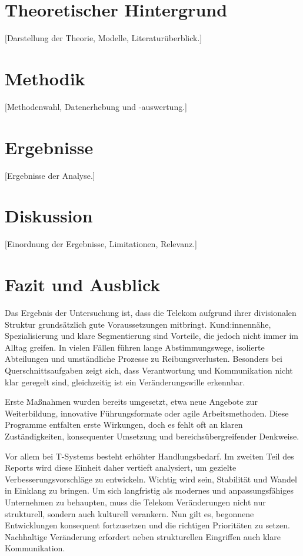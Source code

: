 \documentclass[12pt,a4paper]{article}
\begin{document}
	\section{Theoretischer Hintergrund}
	[Darstellung der Theorie, Modelle, Literaturüberblick.]
	
	\section{Methodik}
	[Methodenwahl, Datenerhebung und -auswertung.]
	
	\section{Ergebnisse}
	[Ergebnisse der Analyse.]
	
	\section{Diskussion}
	[Einordnung der Ergebnisse, Limitationen, Relevanz.]
	
	\section{Fazit und Ausblick }
	
	
	
	
	Das Ergebnis der Untersuchung ist, dass die Telekom aufgrund ihrer
	divisionalen Struktur grundsätzlich gute Voraussetzungen mitbringt.
	Kund:innennähe, Spezialisierung und klare Segmentierung sind Vorteile,
	die jedoch nicht immer im Alltag greifen. In vielen Fällen führen lange
	Abstimmungswege, isolierte Abteilungen und umständliche Prozesse zu
	Reibungsverlusten. Besonders bei Querschnittsaufgaben zeigt sich, dass
	Verantwortung und Kommunikation nicht klar geregelt sind, gleichzeitig
	ist ein Veränderungswille erkennbar.
	
	\noindent Erste Maßnahmen wurden bereits umgesetzt, etwa neue Angebote zur
	Weiterbildung, innovative Führungsformate oder agile Arbeitsmethoden.
	Diese Programme entfalten erste Wirkungen, doch es fehlt oft an klaren
	Zuständigkeiten, konsequenter Umsetzung und bereichsübergreifender
	Denkweise.
	
	\noindent Vor allem bei T-Systems besteht erhöhter Handlungsbedarf. Im zweiten
	Teil des Reports wird diese Einheit daher vertieft analysiert, um
	gezielte Verbesserungsvorschläge zu entwickeln. Wichtig wird sein,
	Stabilität und Wandel in Einklang zu bringen. Um sich langfristig als
	modernes und anpassungsfähiges Unternehmen zu behaupten, muss die
	Telekom Veränderungen nicht nur strukturell, sondern auch kulturell
	verankern. Nun gilt es, begonnene Entwicklungen konsequent fortzusetzen
	und die richtigen Prioritäten zu setzen. Nachhaltige Veränderung
	erfordert neben strukturellen Eingriffen auch klare Kommunikation.
	
\end{document}
